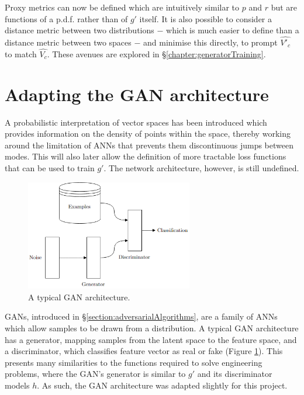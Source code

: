 \documentclass[../../main.tex]{subfiles}
\begin{document}
Proxy metrics can now be defined which are intuitively similar to $p$ and $r$ but are functions of a p.d.f. rather than of $g'$ itself.
It is also possible to consider a distance metric between two distributions $-$ which is much easier to define than a distance metric between two spaces $-$ and minimise this directly, to prompt $\hat{V'_c}$ to match $\hat{V_c}$.
These avenues are explored in \S\ref{chapter:generatorTraining}.

\section{Adapting the GAN architecture} \label{section:adaptingTheGANArchitecture}

A probabilistic interpretation of vector spaces has been introduced which provides information on the density of points within the space, thereby working around the limitation of ANNs that prevents them discontinuous jumps between modes.
This will also later allow the definition of more tractable loss functions that can be used to train $g'$.
The network architecture, however, is still undefined.
\begin{figure}[H]
    \begin{center}
    \includegraphics[width=0.65\textwidth]{ganArchitecture}
    \caption{
		A typical GAN architecture.
    }
    \label{fig:ganArchitecture}
    \end{center}
\end{figure}
GANs, introduced in \S\ref{section:adversarialAlgorithms}, are a family of ANNs which allow samples to be drawn from a distribution.
A typical GAN architecture has a generator, mapping samples from the latent space to the feature space, and a discriminator, which classifies feature vector as real or fake (Figure \ref{fig:ganArchitecture}).
This presents many similarities to the functions required to solve engineering problems, where the GAN's generator is similar to $g'$ and its discriminator models $h$.
As such, the GAN architecture was adapted slightly for this project.
\end{document}
